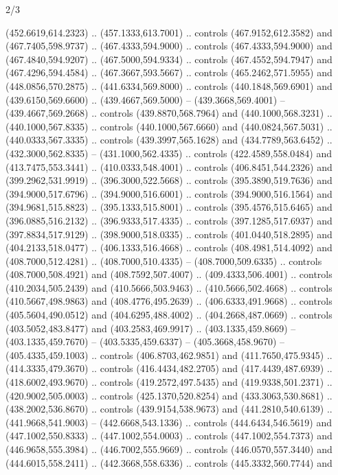 \begin{flagdescription}{2/3}
\begin{scope}[xshift=0.5\flaglength,yshift=0.5\flagwidth,scale=\flagwidth/525.28]
\begin{scope}[y=0.1mm, x=0.1mm, yscale=-1,shift={(-381.5,-404)}]
\begin{scope}[shift={(5.25001,4.53053)},miter limit=4.00,line width=0.800\lw]
  (452.6619,614.2323) .. (457.1333,613.7001) .. controls (467.9152,612.3582) and
  (467.7405,598.9737) .. (467.4333,594.9000) .. controls (467.4333,594.9000) and
  (467.4840,594.9207) .. (467.5000,594.9334) .. controls (467.4552,594.7947) and
  (467.4296,594.4584) .. (467.3667,593.5667) .. controls (465.2462,571.5955) and
  (448.0856,570.2875) .. (441.6334,569.8000) .. controls (440.1848,569.6901) and
  (439.6150,569.6600) .. (439.4667,569.5000) -- (439.3668,569.4001) --
  (439.4667,569.2668) .. controls (439.8870,568.7964) and (440.1000,568.3231) ..
  (440.1000,567.8335) .. controls (440.1000,567.6660) and (440.0824,567.5031) ..
  (440.0333,567.3335) .. controls (439.3997,565.1628) and (434.7789,563.6452) ..
  (432.3000,562.8335) -- (431.1000,562.4335) .. controls (422.4589,558.0484) and
  (413.7475,553.3441) .. (410.0333,548.4001) .. controls (406.8451,544.2326) and
  (399.2962,531.9919) .. (396.3000,522.5668) .. controls (395.3890,519.7636) and
  (394.9000,517.6796) .. (394.9000,516.6001) .. controls (394.9000,516.1564) and
  (394.9681,515.8823) .. (395.1333,515.8001) .. controls (395.4576,515.6465) and
  (396.0885,516.2132) .. (396.9333,517.4335) .. controls (397.1285,517.6937) and
  (397.8834,517.9129) .. (398.9000,518.0335) .. controls (401.0440,518.2895) and
  (404.2133,518.0477) .. (406.1333,516.4668) .. controls (408.4981,514.4092) and
  (408.7000,512.4281) .. (408.7000,510.4335) -- (408.7000,509.6335) .. controls
  (408.7000,508.4921) and (408.7592,507.4007) .. (409.4333,506.4001) .. controls
  (410.2034,505.2439) and (410.5666,503.9463) .. (410.5666,502.4668) .. controls
  (410.5667,498.9863) and (408.4776,495.2639) .. (406.6333,491.9668) .. controls
  (405.5604,490.0512) and (404.6295,488.4002) .. (404.2668,487.0669) .. controls
  (403.5052,483.8477) and (403.2583,469.9917) .. (403.1335,459.8669) --
  (403.1335,459.7670) -- (403.5335,459.6337) -- (405.3668,458.9670) --
  (405.4335,459.1003) .. controls (406.8703,462.9851) and (411.7650,475.9345) ..
  (414.3335,479.3670) .. controls (416.4434,482.2705) and (417.4439,487.6939) ..
  (418.6002,493.9670) .. controls (419.2572,497.5435) and (419.9338,501.2371) ..
  (420.9002,505.0003) .. controls (425.1370,520.8254) and (433.3063,530.8681) ..
  (438.2002,536.8670) .. controls (439.9154,538.9673) and (441.2810,540.6139) ..
  (441.9668,541.9003) -- (442.6668,543.1336) .. controls (444.6434,546.5619) and
  (447.1002,550.8333) .. (447.1002,554.0003) .. controls (447.1002,554.7373) and
  (446.9658,555.3984) .. (446.7002,555.9669) .. controls (446.0570,557.3440) and
  (444.6015,558.2411) .. (442.3668,558.6336) .. controls (445.3332,560.7744) and

\end{scope}
\end{scope}
\end{scope}
\end{flagdescription}
